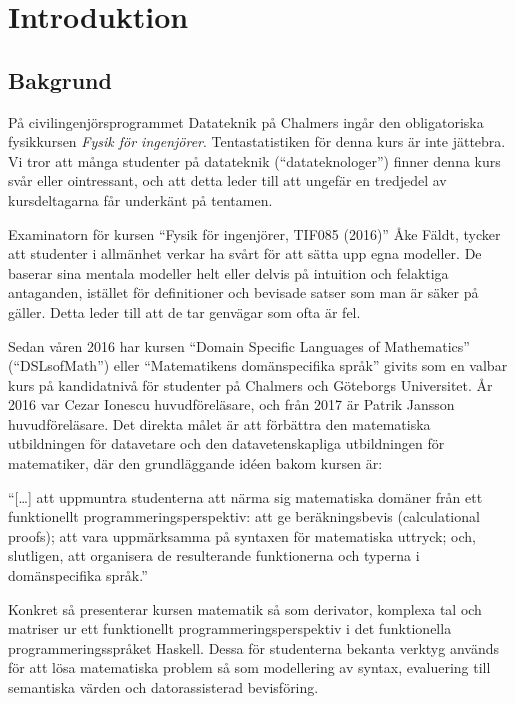 
\chapter{Introduktion}

\section{Bakgrund}

\begin{draft}
På civilingenjörsprogrammet Datateknik på Chalmers ingår den obligatoriska fysikkursen
\textit{Fysik för ingenjörer}. Tentastatistiken för denna kurs är
inte jättebra\cite{tentastatistik}. Vi
tror att många studenter på datateknik (``datateknologer'') finner denna kurs
svår eller ointressant, och att detta leder till att ungefär en
tredjedel av kursdeltagarna får underkänt på tentamen.

Examinatorn för kursen ``Fysik för ingenjörer, TIF085 (2016)'' Åke Fäldt, tycker
att studenter i allmänhet verkar ha svårt för att sätta upp egna
modeller. De baserar sina mentala modeller helt eller delvis på
intuition och felaktiga antaganden, istället för definitioner och
bevisade satser som man är säker på gäller. Detta leder till att de
tar genvägar som ofta är fel.

Sedan våren 2016 har kursen ``Domain Specific Languages of
Mathematics'' (``DSLsofMath'') eller ``Matematikens domänspecifika språk''
givits som en valbar kurs på kandidatnivå för studenter på Chalmers och
Göteborgs Universitet. År 2016 var Cezar Ionescu huvudföreläsare, och från 2017
är Patrik Jansson huvudföreläsare. Det direkta målet är att förbättra den
matematiska utbildningen för datavetare och den datavetenskapliga utbildningen
för matematiker, där den grundläggande idéen bakom kursen är: 

\begin{center}
  ``[\dots] att uppmuntra studenterna att närma sig matematiska domäner från ett
  funktionellt programmeringsperspektiv: att ge beräkningsbevis (calculational
  proofs); att vara uppmärksamma på syntaxen för matematiska uttryck; och,
  slutligen, att organisera de resulterande funktionerna och typerna i
  domänspecifika språk.''\cite{lecture-notes}\cite{tfpie2015} 
\end{center}

Konkret så presenterar kursen matematik så som derivator, komplexa
tal och matriser ur ett funktionellt programmeringsperspektiv i det funktionella programmeringsspråket  %
Haskell. Dessa för studenterna bekanta verktyg används för att lösa
matematiska problem så som modellering av syntax, evaluering till
semantiska värden och datorassisterad bevisföring.


\end{draft}
